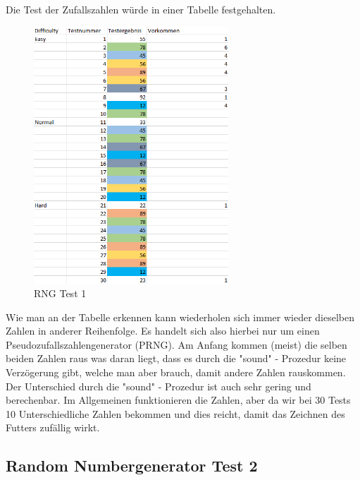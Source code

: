\documentclass[a4paper,10pt]{article}
\begin{document}
			Die Test der Zufallszahlen würde in einer Tabelle festgehalten.\\
			\begin{figure}[h]
				\centering
				\includegraphics[width=0.65\textwidth]{tests}
				\caption{RNG Test 1}
				\label{RNG1}
			\end{figure}
			
			Wie man an der Tabelle erkennen kann wiederholen sich immer wieder 
			dieselben Zahlen in anderer Reihenfolge. Es handelt sich also 
			hierbei nur um einen Pseudozufallszahlengenerator (PRNG). Am Anfang 
			kommen (meist) die selben beiden Zahlen raus was daran liegt, dass 
			es durch die "sound" \- - Prozedur keine Verzögerung gibt, welche 
			man 
			aber brauch, damit andere Zahlen rauskommen. Der Unterschied durch 
			die "sound" \- - Prozedur ist auch sehr gering und berechenbar. Im 
			Allgemeinen funktionieren die Zahlen, aber da wir bei 30 Tests 10 
			Unterschiedliche Zahlen bekommen und dies reicht, damit das 
			Zeichnen des Futters zufällig wirkt.
			\newpage
		\subsection{Random Numbergenerator Test 2}
		
\end{document}
